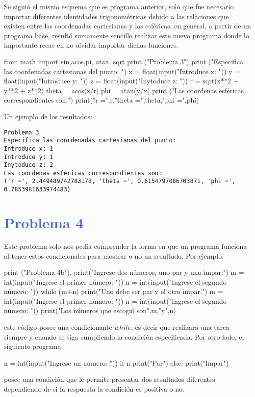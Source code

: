 \documentclass[12pt]{article}
\begin{document}
Se siguió el mismo esquema que es programa anterior, solo que fue necesario importar diferentes identidades trigonométricas debido a las relaciones que existen entre las coordenadas cartesianas y las esféricas; en general, a partir de un programa base, resultó sumamente sencillo realizar este nuevo programa donde lo importante recae en no olvidar importar dichas funciones.
\begin{center}
\begin{boxedverbatim}
from math import sin,acos,pi, atan, sqrt
print ("Problema 3")
print ("Especifica las coordenadas cartesianas del punto: ")
x = float(input("Introduce x: "))
y = float(input("Introduce y: "))
z = float(input("Inytoduce z: "))
r = sqrt(x**2 + y**2 + z**2)
theta = acos(z/r)
phi = atan(y/x)
print ("Las coordenas esféricas correspondientes son:")
print("r =",r,"theta =",theta,"phi =",phi)
\end{boxedverbatim}
\end{center}
Un ejemplo de los resultados:
\begin{verbatim}
Problema 3
Especifica las coordenadas cartesianas del punto: 
Introduce x: 1
Introduce y: 1
Inytoduce z: 2
Las coordenas esféricas correspondientes son:
('r =', 2.449489742783178, 'theta =', 0.6154797086703871, 'phi =', 0.7853981633974483)
\end{verbatim}

\section*{\textcolor{RoyalBlue}{Problema 4}}
Este problema solo nos pedía comprender la forma en que un programa funciona al tener estos condicionales para mostrar o no un resultado. Por ejemplo:
\begin{center}
\begin{boxedverbatim}
print ("Problema 4b"),
print("Ingrese dos números, uno par y uno impar:")
m = int(input("Ingrese el primer número: "))
n = int(input("Ingrese el segundo número: "))
while (m+n)%
    print("Uno debe ser par y el otro impar.")
    m = int(input("Ingrese el primer número: "))
    n = int(input("Ingrese el segundo número: "))
print("Los números que escogió son",m,"y",n)
\end{boxedverbatim}
\end{center}
 este código posee una condicionante $while$, es decir que realizara una tarea siempre y cuando se siga cumpliendo la condición especificada.
 Por otro lado, el siguiente programa:
 \begin{center}
 \begin{boxedverbatim}
 n = int(input("Ingrese un número: "))
 if n%
      print("Par")
 else:
      print("Impar")
 \end{boxedverbatim}
 \end{center}
  posee una condición que le permite presentar dos resultados diferentes dependiendo de si la respuesta la condición es positiva o no.
 \pagebreak
\end{document}
